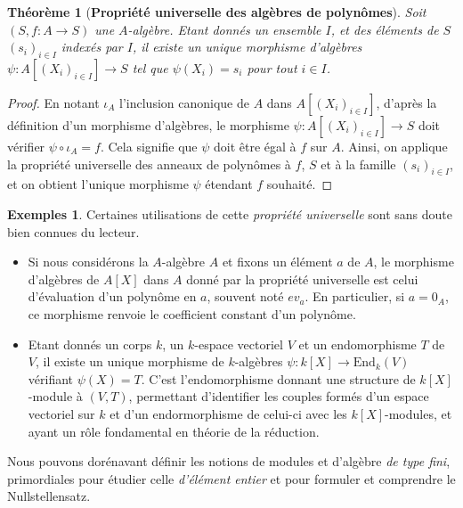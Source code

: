 \documentclass[10pt, twoside]{article}
\theoremstyle{plain}
\newtheorem{theorem}{Théorème}[section]
\theoremstyle{definition}
\theoremstyle{plain}
\theoremstyle{plain}
\theoremstyle{definition}
\newtheorem*{example}{Exemples}
\theoremstyle{remark}
\begin{document}
\begin{theorem}[\textbf{Propriété universelle des algèbres de polynômes}]\label{thm:prop univ alg poly}
    Soit $(S, f : A \rightarrow S)$ une $A$-algèbre. Etant donnés un ensemble $I$, et des éléments de $S$ $(s_i)_{i \in I}$ indexés par $I$, il existe un unique morphisme d'algèbres $\psi : A[(X_i)_{i \in I}] \longrightarrow S$ tel que $\psi(X_i) = s_i$ pour tout $i \in I$.
\end{theorem}

 \begin{proof}
     En notant $\iota_A$ l'inclusion canonique de $A$ dans $A[(X_i)_{i \in I}]$, d'après la définition d'un morphisme d'algèbres, le morphisme $\psi : A[(X_i)_{i \in I}] \longrightarrow S$ doit vérifier $\psi \circ \iota_A = f$. Cela signifie que $\psi$ doit être égal à $f$ sur $A$. Ainsi, on applique la propriété universelle des anneaux de polynômes à  $f$, $S$ et à la famille $(s_i)_{i \in I}$, et on obtient l'unique morphisme $\psi$ étendant $f$ souhaité.
 \end{proof}

\begin{example} 
    Certaines utilisations de cette \textit{propriété universelle} sont sans doute bien connues du lecteur.
    \begin{itemize}
        \item Si nous considérons la $A$-algèbre $A$ et fixons un élément $a$ de $A$, le morphisme d'algèbres de $A[X]$ dans $A$ donné par la propriété universelle est celui d'évaluation d'un polynôme en $a$, souvent noté $ev_a$. En particulier, si $a = 0_A$, ce morphisme renvoie le coefficient constant d'un polynôme.
        \item Etant donnés un corps $k$, un $k$-espace vectoriel $V$ et un endomorphisme $T$ de $V$, il existe un unique morphisme de $k$-algèbres $\psi : k[X] \longrightarrow \text{End}_k(V)$ vérifiant $\psi(X) = T$. C'est l'endomorphisme donnant une structure de $k[X]$-module à $(V, T)$, permettant d'identifier les couples formés d'un espace vectoriel sur $k$ et d'un endormorphisme de celui-ci avec les $k[X]$-modules, et ayant un rôle fondamental en théorie de la réduction.
    \end{itemize}   
\end{example}

Nous pouvons dorénavant définir les notions de modules et d'algèbre \textit{de type fini}, primordiales pour étudier celle \textit{d'élément entier} et pour formuler et comprendre le Nullstellensatz.
\end{document}
